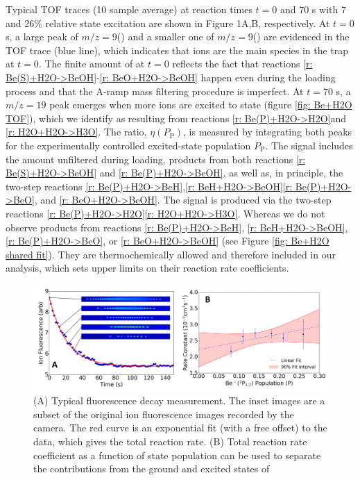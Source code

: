 Typical TOF traces (10 sample average) at reaction times $t=0$ and 70 s with 7 and 26\% relative  state excitation are shown in Figure 1A,B, respectively. At $t=0$ s, a large peak of $m/z=9$() and a smaller one of $m/z=9$() are evidenced in the TOF trace (blue line), which indicates that  ions are the main species in the trap at $t=0$. The finite amount of  at $t=0$ reflects the fact that reactions \ref{r: Be(S)+H2O->BeOH}-\ref{r: BeO+H2O->BeOH} happen even during the loading process and that the A-ramp mass filtering procedure is imperfect. At $t=70$ s, a $m/z=19$ peak emerges when more  ions are excited to  state (figure \ref{fig: Be+H2O TOF}), which we identify as  resulting from reactions \ref{r: Be(P)+H2O->H2O}and \ref{r: H2O+H2O->H3O}. The  ratio, $\eta(P_\text{P})$, is measured by integrating both peaks for the experimentally controlled excited-state population $P_\text{P}$. The  signal includes the amount unfiltered during loading, products from both reactions \ref{r: Be(S)+H2O->BeOH} and \ref{r: Be(P)+H2O->BeOH}, as well as, in principle, the two-step reactions \ref{r: Be(P)+H2O->BeH},\ref{r: BeH+H2O->BeOH}\ref{r: Be(P)+H2O->BeO}, and \ref{r: BeO+H2O->BeOH}. The  signal is produced via the two-step reactions \ref{r: Be(P)+H2O->H2O}\ref{r: H2O+H2O->H3O}. Whereas we do not observe products from reactions \ref{r: Be(P)+H2O->BeH}, \ref{r: BeH+H2O->BeOH}, \ref{r: Be(P)+H2O->BeO}, or \ref{r: BeO+H2O->BeOH} (see Figure \ref{fig: Be+H2O shared fit}). They are thermochemically allowed and therefore included in our analysis, which sets upper limits on their reaction rate coefficients.

\begin{figure}
	\centering
	\includegraphics[width=\textwidth]{images/Be_H2O_fit.png}
	\caption{(A) Typical fluorescence decay measurement. The inset images are a subset of the original ion fluorescence images recorded by the camera. The red curve is an exponential fit (with a free offset) to the data, which gives the total reaction rate. (B) Total reaction rate coefficient as a function of  state population can be used to separate the contributions from the ground and excited states of }
	\label{fig: Be+H2O fit}
\end{figure}

